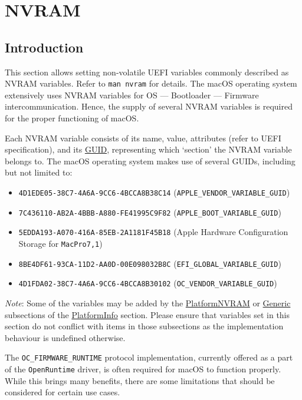 \documentclass[]{article}
\providecommand{\tightlist}{%
  \setlength{\itemsep}{0pt}\setlength{\parskip}{0pt}}
\begin{document}
\section{NVRAM}\label{nvram}

\subsection{Introduction}\label{nvramintro}

This section allows setting non-volatile UEFI variables commonly described
as NVRAM variables. Refer to \texttt{man\ nvram} for details.
The macOS operating system extensively uses NVRAM variables for OS --- Bootloader
--- Firmware intercommunication. Hence, the supply of several NVRAM variables
is required for the proper functioning of macOS.

Each NVRAM variable consists of its name, value, attributes (refer to
UEFI specification), and its
\href{https://en.wikipedia.org/wiki/Universally_unique_identifier}{GUID},
representing which `section' the NVRAM variable belongs to. The macOS
operating system makes use of several GUIDs, including but not limited to:

\begin{itemize}
\tightlist
\item
  \texttt{4D1EDE05-38C7-4A6A-9CC6-4BCCA8B38C14}
  (\texttt{APPLE\_VENDOR\_VARIABLE\_GUID})
\item
  \texttt{7C436110-AB2A-4BBB-A880-FE41995C9F82}
  (\texttt{APPLE\_BOOT\_VARIABLE\_GUID})
\item
  \texttt{5EDDA193-A070-416A-85EB-2A1181F45B18}
  (Apple Hardware Configuration Storage for \texttt{MacPro7,1})
\item
  \texttt{8BE4DF61-93CA-11D2-AA0D-00E098032B8C}
  (\texttt{EFI\_GLOBAL\_VARIABLE\_GUID})
\item
  \texttt{4D1FDA02-38C7-4A6A-9CC6-4BCCA8B30102}
  (\texttt{OC\_VENDOR\_VARIABLE\_GUID})
\end{itemize}

\emph{Note}: Some of the variables may be added by the
\hyperref[platforminfonvram]{PlatformNVRAM} or
\hyperref[platforminfogeneric]{Generic} subsections of the
\hyperref[platforminfo]{PlatformInfo} section.
Please ensure that variables set in this section do not conflict with items
in those subsections as the implementation behaviour is undefined otherwise.

The \texttt{OC\_FIRMWARE\_RUNTIME} protocol implementation, currently offered
as a part of the \texttt{OpenRuntime} driver, is often required for macOS to
function properly. While this brings many benefits, there are some
limitations that should be considered for certain use cases.
\end{document}
